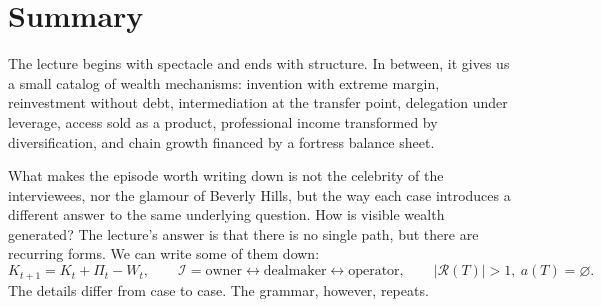 \section{Summary}

The lecture begins with spectacle and ends with structure. In between, it gives us a small catalog of wealth mechanisms: invention with extreme margin, reinvestment without debt, intermediation at the transfer point, delegation under leverage, access sold as a product, professional income transformed by diversification, and chain growth financed by a fortress balance sheet.

What makes the episode worth writing down is not the celebrity of the interviewees, nor the glamour of Beverly Hills, but the way each case introduces a different answer to the same underlying question. How is visible wealth generated? The lecture's answer is that there is no single path, but there are recurring forms. We can write some of them down:
\[
K_{t+1}=K_t+\Pi_t-W_t, \qquad
\mathcal I=\text{owner}\longleftrightarrow \text{dealmaker}\longleftrightarrow \text{operator}, \qquad
|\mathcal R(T)|>1,\ a(T)=\varnothing.
\]
The details differ from case to case. The grammar, however, repeats.